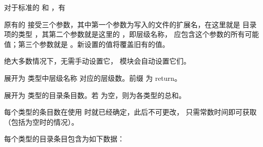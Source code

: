 \documentclass[twoside]{book}
\begin{document}
对于标准的  和 ，有
\begin{xample}
\stopxamplecode 
\xamplecode \medskip
\end{xample}

原有的  接受三个参数，其中第一个参数为写入的文件的扩展名，在这里就是
目录项的类型 ，其第二个参数就是这里的 ，即层级名称， 应包含这个参数的所有可能值；第三个参数就是 。新设置的值将覆盖旧有的值。

绝大多数情况下，无需手动设置它， 模块会自动设置它们。

\begin{function}[EXP]{\retcbltypelevel}
  \begin{syntax}
    \V\retcbltypelevel {} 
  \end{syntax}
展开为  类型中层级名称  对应的层级数。前缀  为 return。
\end{function}

\begin{function}[EXP]{\retcbltotalcounts}
  \begin{syntax}
    \V\retcbltotalcounts {}
  \end{syntax}
展开为  类型的目录条目数。若  为空，则为各类型的总和。

每个类型的条目数在使用  时就已经确定，此后不可更改，
只需常数时间即可获取（包括为空时的情况）。
\end{function}

每个类型的目录条目包含为如下数据：

{\centering {}\par}
\end{document}
